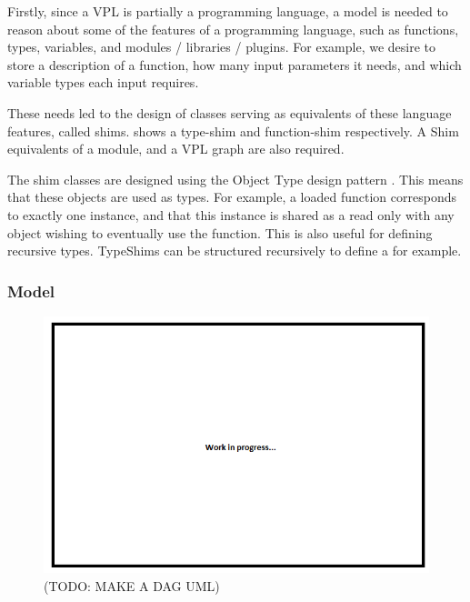 Firstly, since a VPL is partially a programming language, a model is needed to reason about some of the features of a programming language, such as functions, types, variables, and modules / libraries / plugins.
For example, we desire to store a description of a function, how many input parameters it needs, and which variable types each input requires. 

These needs led to the design of classes serving as equivalents of these language features, called shims. 
 shows a type-shim and function-shim respectively. 
A Shim equivalents of a module, and a VPL graph are also required. 

The shim classes are designed using the Object Type design pattern \citep{gamma_design_1994}. 
This means that these objects are used as types. 
For example, a loaded function corresponds to exactly one  instance, and that this instance is shared as a read only with any object wishing to eventually use the function. 
This is also useful for defining recursive types. 
TypeShims can be structured recursively to define a  for example. 



\subsubsection*{Model}
\label{sec:method-model}

\begin{figure}
  \centering
  \graphicspath{ {../../assets/images/misc/} }
  \includegraphics[width=\linewidth]{placeholder.png}
  \caption[Shim Classes]{(TODO: MAKE A DAG UML)}
  \label{fig:dag-model}
\end{figure}

